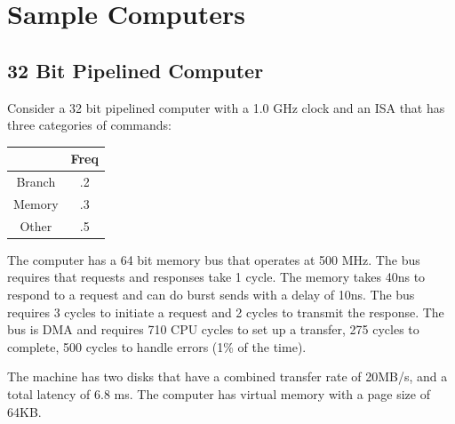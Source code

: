 \chapter{Sample Computers}
\label{c-samples}

\section{32 Bit Pipelined Computer}
Consider a 32 bit pipelined computer with a 1.0 GHz clock and an ISA that has three categories of commands:

\begin{tabular}{|c|c|} \hline
          & Freq \\ \hline
  Branch  & .2   \\ \hline
  Memory  & .3   \\ \hline
  Other   & .5   \\ \hline
\end{tabular}

The computer has a 64 bit memory bus that operates at 500 MHz.  The bus requires that requests and responses take 1 cycle.  The memory takes 40ns to respond to a request and can do burst sends with a delay of 10ns.  The bus requires 3 cycles to initiate a request and 2 cycles to transmit the response.  The bus is DMA and requires 710 CPU cycles to set up a transfer, 275 cycles to complete, 500 cycles to handle errors (1\% of the time).

The machine has two disks that have a combined transfer rate of 20MB/s, and a total latency of 6.8 ms.  The computer has virtual memory with a page size of 64KB.

